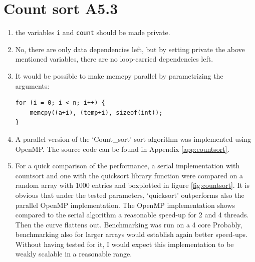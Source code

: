\documentclass[a4paper,11pt,twoside]{article}
\begin{document}
\section{Count sort A5.3}
\begin{enumerate}[label={\alph*)}]
\item the variables \verb+i+ and \verb+count+ should be made private.
\item No, there are only data dependencies left, but by setting private the above mentioned variables, there are no loop-carried dependencies left. 
\item It would be possible to make memcpy parallel by parametrizing the arguments:
\begin{verbatim}
for (i = 0; i < n; i++) {
    memcpy((a+i), (temp+i), sizeof(int));
}
\end{verbatim}
  
\item A parallel version of the `Count\_sort' sort algorithm was implemented using OpenMP. The source code can be found in Appendix \ref{app:countsort}.
  
\item For a quick comparison of the performance, a serial implementation with countsort and one with the quicksort library function were compared on a random array with 1000 entries and boxplotted in figure \ref{fig:countsort}. It is obvious that under the tested parameters, `quicksort' outperforms also the parallel OpenMP implementation. The OpenMP implementation shows compared to the serial algorithm a reasonable speed-up for 2 and 4 threads. Then the curve flattens out. Benchmarking was run on a 4 core Probably, benchmarking also for larger arrays would establish again better speed-ups. Without having tested for it, I would expect this implementation to be weakly scalable in a reasonable range.  
\end{enumerate}
\end{document}

